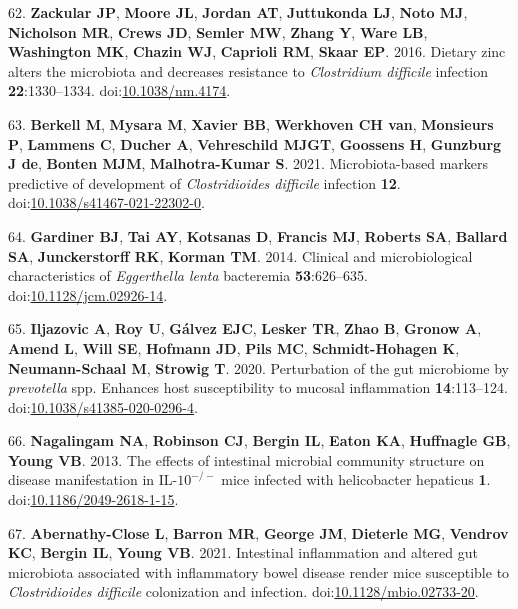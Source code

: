 \documentclass[
  12pt,
]{article}
\newenvironment{cslreferences}%
  {}%
  {\par}
\begin{document}
\begin{cslreferences}
\leavevmode\hypertarget{ref-Zackular2016}{}%
62. \textbf{Zackular JP}, \textbf{Moore JL}, \textbf{Jordan AT},
\textbf{Juttukonda LJ}, \textbf{Noto MJ}, \textbf{Nicholson MR},
\textbf{Crews JD}, \textbf{Semler MW}, \textbf{Zhang Y}, \textbf{Ware
LB}, \textbf{Washington MK}, \textbf{Chazin WJ}, \textbf{Caprioli RM},
\textbf{Skaar EP}. 2016. Dietary zinc alters the microbiota and
decreases resistance to \emph{Clostridium difficile} infection
\textbf{22}:1330--1334.
doi:\href{https://doi.org/10.1038/nm.4174}{10.1038/nm.4174}.

\leavevmode\hypertarget{ref-Berkell2021}{}%
63. \textbf{Berkell M}, \textbf{Mysara M}, \textbf{Xavier BB},
\textbf{Werkhoven CH van}, \textbf{Monsieurs P}, \textbf{Lammens C},
\textbf{Ducher A}, \textbf{Vehreschild MJGT}, \textbf{Goossens H},
\textbf{Gunzburg J de}, \textbf{Bonten MJM}, \textbf{Malhotra-Kumar S}.
2021. Microbiota-based markers predictive of development of
\emph{Clostridioides difficile} infection \textbf{12}.
doi:\href{https://doi.org/10.1038/s41467-021-22302-0}{10.1038/s41467-021-22302-0}.

\leavevmode\hypertarget{ref-Gardiner2014}{}%
64. \textbf{Gardiner BJ}, \textbf{Tai AY}, \textbf{Kotsanas D},
\textbf{Francis MJ}, \textbf{Roberts SA}, \textbf{Ballard SA},
\textbf{Junckerstorff RK}, \textbf{Korman TM}. 2014. Clinical and
microbiological characteristics of \emph{Eggerthella lenta} bacteremia
\textbf{53}:626--635.
doi:\href{https://doi.org/10.1128/jcm.02926-14}{10.1128/jcm.02926-14}.

\leavevmode\hypertarget{ref-Iljazovic2020}{}%
65. \textbf{Iljazovic A}, \textbf{Roy U}, \textbf{Gálvez EJC},
\textbf{Lesker TR}, \textbf{Zhao B}, \textbf{Gronow A}, \textbf{Amend
L}, \textbf{Will SE}, \textbf{Hofmann JD}, \textbf{Pils MC},
\textbf{Schmidt-Hohagen K}, \textbf{Neumann-Schaal M}, \textbf{Strowig
T}. 2020. Perturbation of the gut microbiome by \emph{prevotella} spp.
Enhances host susceptibility to mucosal inflammation
\textbf{14}:113--124.
doi:\href{https://doi.org/10.1038/s41385-020-0296-4}{10.1038/s41385-020-0296-4}.

\leavevmode\hypertarget{ref-Nagalingam2013}{}%
66. \textbf{Nagalingam NA}, \textbf{Robinson CJ}, \textbf{Bergin IL},
\textbf{Eaton KA}, \textbf{Huffnagle GB}, \textbf{Young VB}. 2013. The
effects of intestinal microbial community structure on disease
manifestation in IL-\(10^{-/-}\) mice infected with helicobacter
hepaticus \textbf{1}.
doi:\href{https://doi.org/10.1186/2049-2618-1-15}{10.1186/2049-2618-1-15}.

\leavevmode\hypertarget{ref-AbernathyClose2021}{}%
67. \textbf{Abernathy-Close L}, \textbf{Barron MR}, \textbf{George JM},
\textbf{Dieterle MG}, \textbf{Vendrov KC}, \textbf{Bergin IL},
\textbf{Young VB}. 2021. Intestinal inflammation and altered gut
microbiota associated with inflammatory bowel disease render mice
susceptible to \emph{Clostridioides difficile} colonization and
infection.
doi:\href{https://doi.org/10.1128/mbio.02733-20}{10.1128/mbio.02733-20}.
\end{cslreferences}
\end{document}

